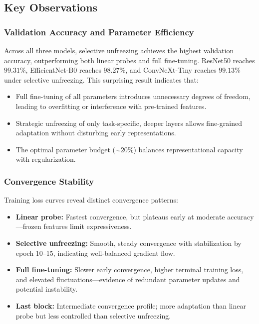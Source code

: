 \documentclass[11pt,a4paper]{article}
\begin{document}
\subsection{Key Observations}

\subsubsection*{Validation Accuracy and Parameter Efficiency}
Across all three models, selective unfreezing achieves the highest validation accuracy, outperforming both linear probes and full fine-tuning. ResNet50 reaches $99.31\%$, EfficientNet-B0 reaches $98.27\%$, and ConvNeXt-Tiny reaches $99.13\%$ under selective unfreezing. This surprising result indicates that:

\begin{itemize}
	\item Full fine-tuning of all parameters introduces unnecessary degrees of freedom, leading to overfitting or interference with pre-trained features.
	\item Strategic unfreezing of only task-specific, deeper layers allows fine-grained adaptation without disturbing early representations.
	\item The optimal parameter budget ($\sim20\%$) balances representational capacity with regularization.
\end{itemize}

\subsubsection*{Convergence Stability}
Training loss curves reveal distinct convergence patterns:

\begin{itemize}
	\item \textbf{Linear probe:} Fastest convergence, but plateaus early at moderate accuracy—frozen features limit expressiveness.
	\item \textbf{Selective unfreezing:} Smooth, steady convergence with stabilization by epoch 10--15, indicating well-balanced gradient flow.
	\item \textbf{Full fine-tuning:} Slower early convergence, higher terminal training loss, and elevated fluctuations—evidence of redundant parameter updates and potential instability.
	\item \textbf{Last block:} Intermediate convergence profile; more adaptation than linear probe but less controlled than selective unfreezing.
\end{itemize}
\end{document}
